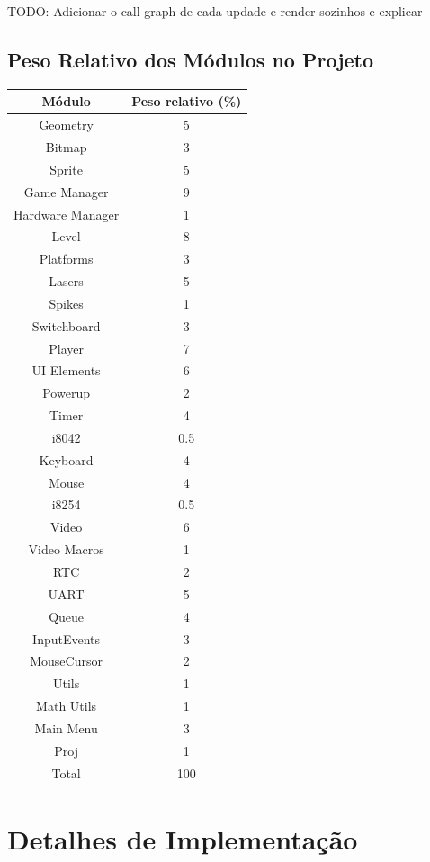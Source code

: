 \documentclass{report}
\begin{document}
TODO: Adicionar o call graph de cada updade e render sozinhos e explicar

\section{Peso Relativo dos Módulos no Projeto}

\begin{center}
	\begin{tabular}{|c|c|} 
		\hline
			Módulo & Peso relativo (\%) \\
		\hline
		\hline
			Geometry & 5 \\
			Bitmap & 3 \\
			Sprite & 5 \\
			Game Manager & 9 \\
			Hardware Manager & 1 \\
			Level & 8 \\
			Platforms & 3 \\
			Lasers & 5 \\
			Spikes & 1 \\
			Switchboard & 3 \\ 
			Player & 7 \\
			UI Elements & 6 \\
			Powerup & 2 \\
			Timer & 4 \\
			i8042 & 0.5 \\
			Keyboard & 4 \\
			Mouse & 4 \\
			i8254 & 0.5 \\
			Video & 6 \\
			Video Macros & 1 \\
			RTC & 2 \\
			UART & 5 \\
			Queue & 4 \\
			InputEvents & 3 \\
			MouseCursor & 2 \\
			Utils & 1 \\
			Math Utils & 1 \\
			Main Menu & 3 \\
			Proj & 1 \\
		\hline
		\hline
			Total & 100 \\
		\hline
	\end{tabular}
\end{center}

\chapter{Detalhes de Implementação}
\end{document}

